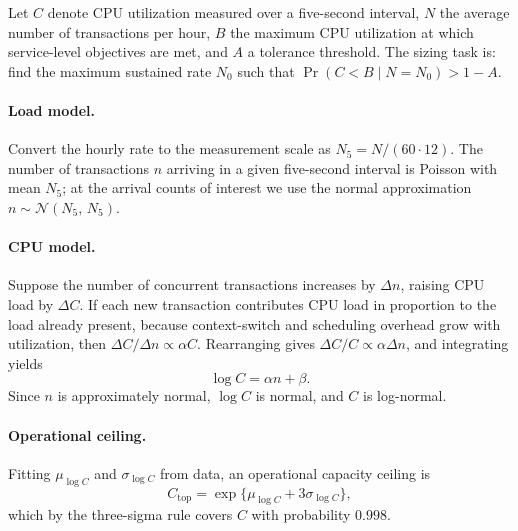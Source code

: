 \documentclass[11pt,a4paper]{article}
\newcommand{\Ctop}{C_{\text{top}}}
\begin{document}
Let $C$ denote CPU utilization measured over a five-second interval, $N$ the
average number of transactions per hour, $B$ the maximum CPU utilization at
which service-level objectives are met, and $A$ a tolerance threshold. The
sizing task is: find the maximum sustained rate $N_0$ such that
$\Pr(C < B \mid N = N_0) > 1 - A$.

\paragraph{Load model.}
Convert the hourly rate to the measurement scale as $N_5 = N / (60 \cdot 12)$.
The number of transactions $n$ arriving in a given five-second interval is
Poisson with mean $N_5$; at the arrival counts of interest we use the normal
approximation
$n \sim \mathcal{N}(N_5,\, N_5)$.

\paragraph{CPU model.}
Suppose the number of concurrent transactions increases by $\Delta n$,
raising CPU load by $\Delta C$. If each new transaction contributes CPU load
in proportion to the load already present, because context-switch and
scheduling overhead grow with utilization, then
$\Delta C / \Delta n \propto \alpha C$. Rearranging gives
$\Delta C / C \propto \alpha \Delta n$, and integrating yields
\begin{equation}
  \log C = \alpha n + \beta.
  \label{eq:logCmodel}
\end{equation}
Since $n$ is approximately normal, $\log C$ is normal, and $C$ is log-normal.

\paragraph{Operational ceiling.}
Fitting $\mu_{\log C}$ and $\sigma_{\log C}$ from data, an operational
capacity ceiling is
\begin{equation}
  \Ctop = \exp\{\mu_{\log C} + 3\sigma_{\log C}\},
\end{equation}
which by the three-sigma rule covers $C$ with probability $0.998$.
\end{document}
